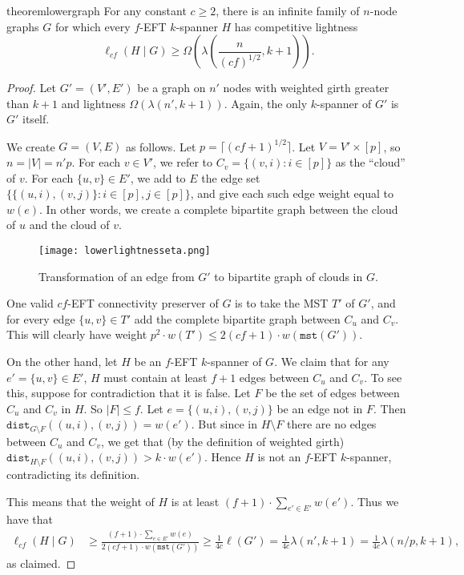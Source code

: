 \documentclass{article}
\theoremstyle{plain}
\theoremstyle{definition}
\newcommand{\dist}{\texttt{dist}}
\newcommand{\mst}{\texttt{mst}}
\begin{document}
\begin{restatable}{theorem}{lowergraph} \label{thm:lower-bound-lambda-graph}
     For any constant $c \geq 2$, there is an infinite family of $n$-node graphs $G$ for which every $f$-EFT $k$-spanner $H$ has competitive lightness
     $$\ell_{cf}(H \mid G) \geq \Omega\left(\lambda\left(\frac{n}{(cf)^{1/2}}, k+1\right)\right).$$
\end{restatable}
\begin{proof}
    Let $G' = (V', E')$ be a graph on $n'$ nodes with weighted girth greater than $k+1$ and lightness $\Omega(\lambda(n', k+1))$.  Again, the only $k$-spanner of $G'$ is $G'$ itself.

    We create $G = (V, E)$ as follows.  Let $p = \lceil (cf+1)^{1/2} \rceil$.  Let $V = V' \times [p]$, so $n=|V| = n'p$.  For each $v \in V'$, we refer to $C_v = \{(v, i) : i \in [p]\}$ as the ``cloud'' of $v$.  For each $\{u,v\} \in E'$, we add to $E$ the edge set $\{\{(u,i), (v,j)\} : i \in [p], j \in [p]\}$, and give each such edge weight equal to $w(e)$.  In other words, we create a complete bipartite graph between the  cloud of $u$ and the cloud of $v$.

    \begin{figure}[ht]
    \centering
    \texttt{[image: lowerlightnesseta.png]}
    \label{fig:edgechange}
    \caption{Transformation of an edge from $G'$ to bipartite graph of clouds in $G$.}
    \end{figure}
    
    One valid $cf$-EFT connectivity preserver of $G$ is to take the MST $T'$ of $G'$, and for every edge $\{u,v\} \in T'$ add the complete bipartite graph between $C_u$ and $C_v$.  This will clearly have weight $p^2 \cdot w(T') \leq 2(cf+1) \cdot w(\mst(G'))$.  
    
    On the other hand, let $H$ be an $f$-EFT $k$-spanner of $G$.  We claim that for any $e' = \{u,v\} \in E'$, $H$ must contain at least $f+1$ edges between $C_u$ and $C_v$.  To see this, suppose for contradiction that it is false.  Let $F$ be the set of edges between $C_u$ and $C_v$ in $H$.  So $|F| \leq f$.  Let $e = \{(u,i), (v,j)\}$ be an edge not in $F$.  Then $\dist_{G \setminus F}((u,i), (v,j)) = w(e')$.  But since in $H \setminus F$ there are no edges between $C_u$ and $C_v$, we get that (by the definition of weighted girth) $\dist_{H \setminus F}((u,i), (v,j))> k \cdot w(e')$.  Hence $H$ is not an $f$-EFT $k$-spanner, contradicting its definition.  

    This means that the weight of $H$ is at least $(f+1) \cdot \sum_{e' \in E'} w(e')$.  Thus we have that
    \begin{align*}
        \ell_{cf}(H \mid G) &\geq \frac{(f+1) \cdot \sum_{e \in E'} w(e)}{2(cf+1) \cdot w(\mst(G'))} \geq \frac{1}{4c} \ell(G') = \frac{1}{4c} \lambda(n', k+1) = \frac{1}{4c} \lambda(n/p, k+1),
    \end{align*}
    as claimed.
\end{proof}
\end{document}
